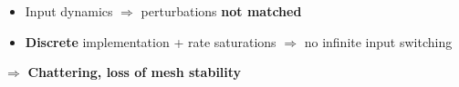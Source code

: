 \documentclass[]{beamer}
\begin{document}
\begin{frame}\frametitle{}
\centering
\begin{tcolorbox}[colback=blue!5!white,colframe=blue!75!black,title=Clash with reality, width=20em,
standard jigsaw,
opacityback=.7]
\begin{itemize}
\item Input dynamics $\Rightarrow$ perturbations \textbf{not matched} 
\item \textbf{Discrete} implementation + rate saturations $\Rightarrow$ no infinite input switching
\end{itemize}
\centering
$\Rightarrow$ \textbf{ Chattering, loss of mesh stability} 
\end{tcolorbox}
\end{frame}


\usebackgroundtemplate{}
\end{document}
